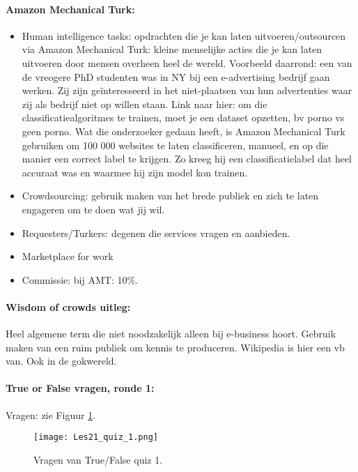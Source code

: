 \documentclass[10pt,a4paper]{report}
\begin{document}
\paragraph{Amazon Mechanical Turk:}
\begin{itemize}
\item Human intelligence tasks: opdrachten die je kan laten uitvoeren/outsourcen via Amazon Mechanical Turk: kleine menselijke acties die je kan laten uitvoeren door mensen overheen heel de wereld. Voorbeeld daarrond: een van de vreogere PhD studenten was in NY bij een e-advertising bedrijf gaan werken. Zij zijn ge\"interesseerd in het niet-plaatsen van hun advertenties waar zij als bedrijf niet op willen staan. Link naar hier: om die classificatiealgoritmes te trainen, moet je een dataset opzetten, bv porno vs geen porno. Wat die onderzoeker gedaan heeft, is Amazon Mechanical Turk gebruiken om 100 000 websites te laten classificeren, manueel, en op die manier een correct label te krijgen. Zo kreeg hij een classificatielabel dat heel accuraat was en waarmee hij zijn model kon trainen.
\item Crowdsourcing: gebruik maken van het brede publiek en zich te laten engageren om te doen wat jij wil.
\item Requesters/Turkers: degenen die services vragen en aanbieden.
\item Marketplace for work
\item Commissie: bij AMT: 10\%.
\end{itemize}

\paragraph{Wisdom of crowds uitleg:}Heel algemene term die niet noodzakelijk alleen bij e-business hoort. Gebruik maken van een ruim publiek om kennis te produceren. Wikipedia is hier een vb van. Ook in de gokwereld.

\paragraph{True or False vragen, ronde 1:} Vragen: zie Figuur \ref{Les21_1}.

\begin{figure}[ht!]
\centering
\texttt{[image: Les21\_quiz\_1.png]}
\caption{Vragen van True/False quiz 1. \label{Les21_1}}
\end{figure}
\end{document}
